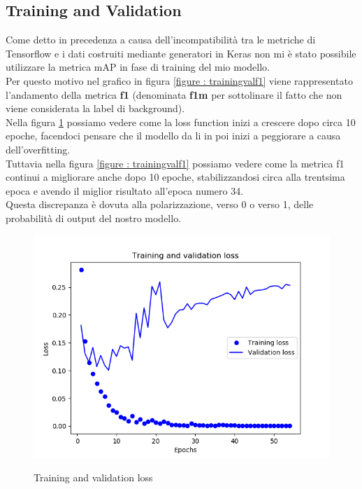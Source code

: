 \subsection{Training and Validation}
Come detto in precedenza a causa dell'incompatibilità tra le metriche di Tensorflow e i dati costruiti mediante generatori in Keras non mi è stato possibile  utilizzare la metrica mAP in fase di training del mio modello.
\\Per questo motivo nel grafico in figura \ref{figure : trainingvalf1} viene rappresentato l'andamento della metrica \textbf{f1} (denominata \textbf{f1m} per sottolinare il fatto che non viene considerata la label di background).
\\Nella figura \ref{figure : trainingvalloss} possiamo vedere come la loss function inizi a crescere dopo circa 10 epoche, facendoci pensare che il modello da li in poi inizi a peggiorare a causa dell'overfitting.
\\Tuttavia nella figura \ref{figure : trainingvalf1} possiamo vedere come la metrica f1 continui a migliorare anche dopo 10 epoche, stabilizzandosi circa alla trentsima epoca e avendo il miglior risultato all'epoca numero 34.
\\Questa discrepanza è dovuta alla polarizzazione, verso 0 o verso 1, delle probabilità di output del nostro modello.
\begin{figure}
\centering
\caption{Training and validation loss}
\includegraphics[scale=0.7]{img/training-validation-loss.png}
\label{figure : trainingvalloss}
\end{figure}
